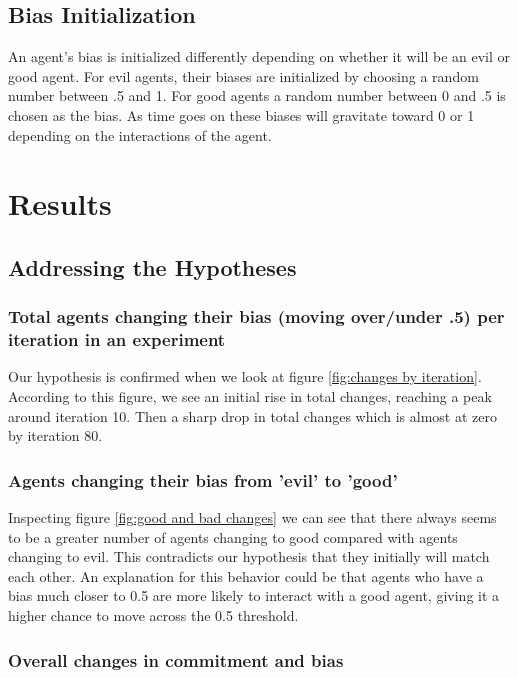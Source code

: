 \documentclass[]{article}
\begin{document}
\subsection{Bias Initialization}
An agent's bias is initialized differently depending on whether it will be an evil or good agent. For evil agents, their biases are initialized by choosing a random number between .5 and 1. For good agents a random number between 0 and .5 is chosen as the bias. As time goes on these biases will gravitate toward 0 or 1 depending on the interactions of the agent.



\section{Results}
\subsection{Addressing the Hypotheses}
\subsubsection{Total agents changing their bias (moving over/under .5) per iteration in an experiment} 
Our hypothesis is confirmed when we look at figure \ref{fig:changes by iteration}. According to this figure, we see an initial rise in total changes, reaching a peak around iteration 10. Then a sharp drop in total changes which is almost at zero by iteration 80. 

\subsubsection{Agents changing their bias from 'evil' to 'good'} 
Inspecting figure \ref{fig:good and bad changes} we can see that there always seems to be a greater number of agents changing to good compared with agents changing to evil. This contradicts our hypothesis that they initially will match each other. An explanation for this behavior could be that agents who have a bias much closer to 0.5 are more likely to interact with a good agent, giving it a higher chance to move across the 0.5 threshold.


\subsubsection{Overall changes in commitment and bias} 
\end{document}

